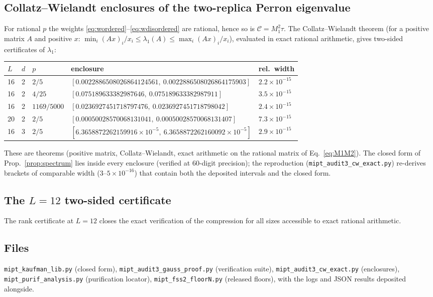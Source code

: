 \documentclass[11pt]{article}
\newcommand{\Ccomp}{\mathcal{C}}
\begin{document}
\subsection{Collatz--Wielandt enclosures of the two-replica Perron
eigenvalue}\label{app:enclosures}
For rational $p$ the weights \eqref{eq:wordered}--\eqref{eq:wdisordered} are
rational, hence so is $\Ccomp=M_1^2\tau$.  The Collatz--Wielandt theorem
(for a positive matrix $A$ and positive $x$:
$\min_i(Ax)_i/x_i\le\lambda_1(A)\le\max_i(Ax)_i/x_i$), evaluated in exact
rational arithmetic, gives two-sided certificates of $\lambda_1$:
\begin{center}
\begin{tabular}{lllll}
\toprule
$L$ & $d$ & $p$ & enclosure & rel.\ width\\
\midrule
16 & 2 & $2/5$       & $[0.0022886508026864124561,\ 0.0022886508026864175903]$ & $2.2\times10^{-15}$\\
16 & 2 & $4/25$      & $[0.075189633382987646,\    0.075189633382987911]$     & $3.5\times10^{-15}$\\
16 & 2 & $1169/5000$ & $[0.0236927451718797476,\   0.0236927451718798042]$    & $2.4\times10^{-15}$\\
20 & 2 & $2/5$       & $[0.00050028570068131041,\  0.00050028570068131407]$    & $7.3\times10^{-15}$\\
16 & 3 & $2/5$       & $[6.3658872262159916{\times}10^{-5},\ 6.3658872262160092{\times}10^{-5}]$ & $2.9\times10^{-15}$\\
\bottomrule
\end{tabular}
\end{center}
These are theorems (positive matrix, Collatz--Wielandt, exact arithmetic on
the rational matrix of Eq.~\eqref{eq:M1M2}).  The closed form of
Prop.~\ref{prop:spectrum} lies inside every enclosure (verified at
$60$-digit precision); the reproduction
(\texttt{mipt\_audit3\_cw\_exact.py}) re-derives brackets of comparable
width ($3$--$5\times10^{-16}$) that contain both the deposited intervals and
the closed form.

\subsection{The $L=12$ two-sided certificate}\label{app:L12}
The rank certificate at $L=12$ closes the exact verification of the
compression for all sizes accessible to exact rational arithmetic.

\subsection{Files}\label{app:files}
\texttt{mipt\_kaufman\_lib.py} (closed form),
\texttt{mipt\_audit3\_gauss\_proof.py} (verification suite),
\texttt{mipt\_audit3\_cw\_exact.py} (enclosures),
\texttt{mipt\_purif\_analysis.py} (purification locator),
\texttt{mipt\_fss2\_floorN.py} (released floors), with the logs and JSON
results deposited alongside.
\end{document}

